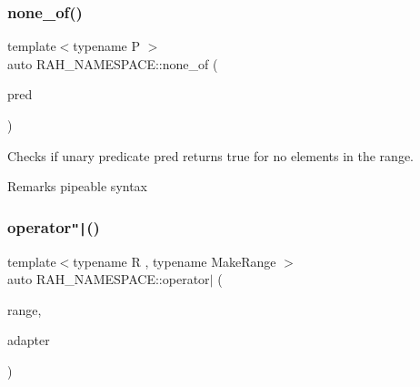 \subsubsection{\texorpdfstring{none\_of()}{none\_of()}\hspace{0.1cm}{\footnotesize\ttfamily [2/2]}}
{\footnotesize\ttfamily template$<$typename P $>$ \\
auto R\+A\+H\+\_\+\+N\+A\+M\+E\+S\+P\+A\+C\+E\+::none\+\_\+of (\begin{DoxyParamCaption}\item[{P \&\&}]{pred }\end{DoxyParamCaption})}



Checks if unary predicate pred returns true for no elements in the range. 

\begin{DoxyRemark}{Remarks}
pipeable syntax
\end{DoxyRemark}

\begin{DoxyCodeInclude}{0}
\DoxyCodeLine{    ) == \textcolor{keyword}{false});}
\end{DoxyCodeInclude}
\mbox{\label{namespace_r_a_h___n_a_m_e_s_p_a_c_e_ac70ad03bbe29c97324a4ffe14f7990fc}} 
\subsubsection{\texorpdfstring{operator\texttt{"|}()}{operator|()}}
{\footnotesize\ttfamily template$<$typename R , typename Make\+Range $>$ \\
auto R\+A\+H\+\_\+\+N\+A\+M\+E\+S\+P\+A\+C\+E\+::operator$\vert$ (\begin{DoxyParamCaption}\item[{R \&\&}]{range,  }\item[{\mbox{\hyperlink{struct_r_a_h___n_a_m_e_s_p_a_c_e_1_1pipeable}{pipeable}}$<$ Make\+Range $>$ const \&}]{adapter }\end{DoxyParamCaption})}

